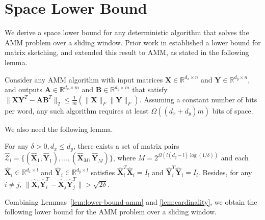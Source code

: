 
\section{Space Lower Bound}
\label{sec:sec-LowerBound}

We derive a space lower bound for any deterministic algorithm that solves the AMM problem over a sliding window. Prior work in \cite{GhashamiLPW16} established a lower bound for matrix sketching, and \cite{LuoCXY21} extended this result to AMM, as stated in the following lemma.

\begin{lemma}\label{lem:lower-bound-amm}
Consider any AMM algorithm with input matrices \( \boldsymbol{X} \in \mathbb{R}^{d_x \times n} \) and \( \boldsymbol{Y} \in \mathbb{R}^{d_y \times n} \), and outputs \( \boldsymbol{A} \in \mathbb{R}^{d_x \times m} \) and \( \boldsymbol{B} \in \mathbb{R}^{d_y \times m} \) that satisfy
\( \|\boldsymbol{X}\boldsymbol{Y}^T - \boldsymbol{A}\boldsymbol{B}^T\|_2 \le \frac{1}{m}(\|\boldsymbol{X}\|_F \|\boldsymbol{Y}\|_F) \).
Assuming a constant number of bits per word, any such algorithm requires at least \( \Omega((d_x+d_y)m) \) bits of space.
\end{lemma}

We also need the following lemma.

\begin{lemma}\label{lem:cardinality}
For any \( \delta > 0,  d_x \le d_y \), there exists a set of matrix pairs 
\( \hat{\mathcal{Z}}_l = \{ (\hat{\boldsymbol{X}}_1,\hat{\boldsymbol{Y}}_1), \dots, (\hat{\boldsymbol{X}}_M,\hat{\boldsymbol{Y}}_M) \} \),
where \( M = 2^{\Omega(l(d_y-l)\log(1/\delta))} \) and each \( \hat{\boldsymbol{X}}_i \in \mathbb{R}^{d_x \times l} \) and \( \hat{\boldsymbol{Y}}_i \in \mathbb{R}^{d_y \times l} \) satisfies 
\( \hat{\boldsymbol{X}}_i^T\hat{\boldsymbol{X}}_i = I_l \) and \( \hat{\boldsymbol{Y}}_i^T\hat{\boldsymbol{Y}}_i = I_l \). Besides, for any \( i \neq j \), 
\( \|\hat{\boldsymbol{X}}_i\hat{\boldsymbol{Y}}_i^T - \hat{\boldsymbol{X}}_j\hat{\boldsymbol{Y}}_j^T\| > \sqrt{2\delta} \).
\end{lemma}

Combining Lemmas~\ref{lem:lower-bound-amm} and \ref{lem:cardinality}, we obtain the following lower bound for the AMM problem over a sliding window.

